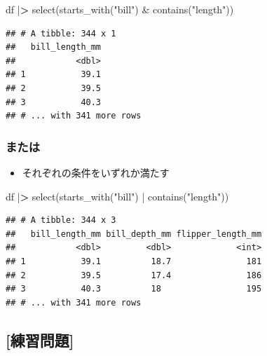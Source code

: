 \documentclass[
  xelatex,ja=standard, b5paper]{bxjsbook}
\newenvironment{Shaded}{\begin{snugshade}}{\end{snugshade}}
\newcommand{\ErrorTok}[1]{\textcolor[rgb]{0.64,0.00,0.00}{\textbf{#1}}}
\newcommand{\FunctionTok}[1]{\textcolor[rgb]{0.00,0.00,0.00}{#1}}
\newcommand{\NormalTok}[1]{#1}
\newcommand{\SpecialCharTok}[1]{\textcolor[rgb]{0.00,0.00,0.00}{#1}}
\newcommand{\StringTok}[1]{\textcolor[rgb]{0.31,0.60,0.02}{#1}}
\providecommand{\tightlist}{%
  \setlength{\itemsep}{0pt}\setlength{\parskip}{0pt}}
\begin{document}
\begin{Shaded}
\begin{Highlighting}[]
\NormalTok{df }\SpecialCharTok{|}\ErrorTok{\textgreater{}}
  \FunctionTok{select}\NormalTok{(}\FunctionTok{starts\_with}\NormalTok{(}\StringTok{"bill"}\NormalTok{) }\SpecialCharTok{\&} \FunctionTok{contains}\NormalTok{(}\StringTok{"length"}\NormalTok{))}
\end{Highlighting}
\end{Shaded}

\begin{verbatim}
## # A tibble: 344 x 1
##   bill_length_mm
##            <dbl>
## 1           39.1
## 2           39.5
## 3           40.3
## # ... with 341 more rows
\end{verbatim}

\hypertarget{select-helper5-2}{%
\subsubsection{または}\label{select-helper5-2}}

\begin{itemize}
\tightlist
\item
  それぞれの条件をいずれか満たす
\end{itemize}

\begin{Shaded}
\begin{Highlighting}[]
\NormalTok{df }\SpecialCharTok{|}\ErrorTok{\textgreater{}}
  \FunctionTok{select}\NormalTok{(}\FunctionTok{starts\_with}\NormalTok{(}\StringTok{"bill"}\NormalTok{) }\SpecialCharTok{|} \FunctionTok{contains}\NormalTok{(}\StringTok{"length"}\NormalTok{))}
\end{Highlighting}
\end{Shaded}

\begin{verbatim}
## # A tibble: 344 x 3
##   bill_length_mm bill_depth_mm flipper_length_mm
##            <dbl>         <dbl>             <int>
## 1           39.1          18.7               181
## 2           39.5          17.4               186
## 3           40.3          18                 195
## # ... with 341 more rows
\end{verbatim}

\hypertarget{ux7df4ux7fd2ux554fux984c-1}{%
\subsection{{[}練習問題{]}}\label{ux7df4ux7fd2ux554fux984c-1}}
\end{document}
